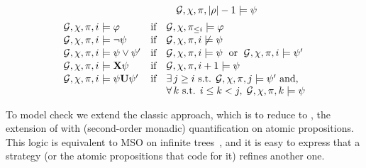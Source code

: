 \begin{definition}
\[\begin{array}{lcl}
  & &\quad   \CGS,\assign,\iplay,|\fplay|-1\modelsSL \psi\\[5pt]
    \CGS,\assign,\iplay,i\modelsSL \phi & \text{if} &
                                                         \CGS,\assign,\iplay_{\leq i}\modelsSL\phi\\[1pt]
   \CGS,\assign,\iplay,i\modelsSL \neg\psi & \text{if} &
  \CGS,\assign,\iplay,i\not\modelsSL\psi\\[1pt]
 \CGS,\assign,\iplay,i\modelsSL \psi\ou\psi' & \text{if} &
  \CGS,\assign,\iplay,i\modelsSL\psi \;\text{ or }\;
  \CGS,\assign,\iplay,i\modelsSL\psi' \\[1pt]
  \CGS,\assign,\iplay,i\modelsSL\X\psi & \text{if} &
  \CGS,\assign,\iplay,i+1\modelsSL\psi\\[1pt]
\CGS,\assign,\iplay,i\modelsSL\psi\until\psi' & \text{if} & \exists\, j\geq i
   \mbox{ s.t. }\CGS,\assign,\iplay,j\modelsSL \psi' \text{ and,}\\ 
   & & \forall\, k \text{ s.t. } i\leq k <j,
\; \CGS,\assign,\iplay,k\modelsSL \psi
\end{array}
\]
\end{definition}



To model check \SLref we extend the classic approach, which is to
reduce to \QCTLs, the extension of \CTLs with (second-order monadic) quantification on atomic
propositions. This logic is equivalent to MSO on infinite
trees~\cite{DBLP:journals/corr/LaroussinieM14}, and it is  easy to
express that a strategy (or the atomic propositions that code for it)
refines another one.

